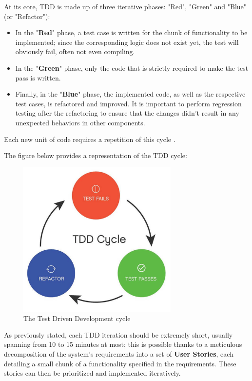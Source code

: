 At its core, TDD is made up of three iterative phases: "Red", "Green" and "Blue" (or "Refactor"):
\begin{itemize}
    \item In the "\textbf{Red}" phase, a test case is written for the chunk of functionality to be implemented; since the corresponding logic does not exist yet, the test will obviously fail, often not even compiling.
    \item In the "\textbf{Green}" phase, only the code that is strictly required to make the test pass is written.
    \item Finally, in the "\textbf{Blue}" phase, the implemented code, as well as the respective test cases, is refactored and improved. It is important to perform regression testing after the refactoring to ensure that the changes didn't result in any unexpected behaviors in other components.
\end{itemize}
Each new unit of code requires a repetition of this cycle \cite{GuidelinesTDD}.

The figure below provides a representation of the TDD cycle:
\begin{figure}[h]
    \centering
    \includegraphics[width=8cm, scale=0.2]{figures/tdd_cycle.jpg}
    \caption{The Test Driven Development cycle}
    \label{tdd-cycle}
\end{figure}

As previously stated, each TDD iteration should be extremely short, usually spanning from 10 to 15 minutes at most; this is possible thanks to a meticulous decomposition of the system's requirements into a set of \textbf{User Stories}, each detailing a small chunk of a functionality specified in the requirements. These stories can then be prioritized and implemented iteratively.

